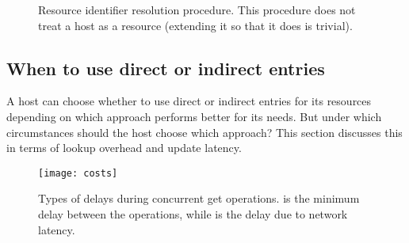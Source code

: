 \documentclass{article}
\begin{document}
\begin{figure}
  \centering
  \caption{Resource identifier resolution procedure.  This procedure
    does not treat a host as a resource (extending it so that it does
    is trivial).}
  \label{fig:resolution-procedure}
\end{figure}


\subsection{When to use direct or indirect entries}
\label{sec:threshold}

A host can choose whether to use direct or indirect entries for its
resources depending on which approach performs better for its needs.
But under which circumstances should the host choose which approach?
This section discusses this in terms of lookup overhead and update
latency.

\begin{figure}
  \centering
  \texttt{[image: costs]}
  \caption{Types of delays during concurrent get operations.   is
    the minimum delay between the operations, while  is the delay
    due to network latency.}
  \label{fig:cost-types}
\end{figure}
\end{document}
